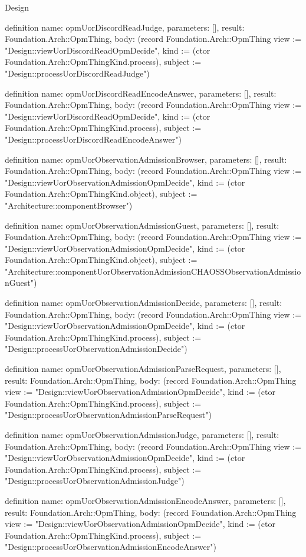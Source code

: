 \begin{lexlean}{Design}
\begin{semanticmodule}
definition{
  name: opmUorDiscordReadJudge,
  parameters: [],
  result: Foundation.Arch::OpmThing,
  body: (record Foundation.Arch::OpmThing {view := "Design::viewUorDiscordReadOpmDecide", kind := (ctor Foundation.Arch::OpmThingKind.process), subject := "Design::processUorDiscordReadJudge"})
}

definition{
  name: opmUorDiscordReadEncodeAnswer,
  parameters: [],
  result: Foundation.Arch::OpmThing,
  body: (record Foundation.Arch::OpmThing {view := "Design::viewUorDiscordReadOpmDecide", kind := (ctor Foundation.Arch::OpmThingKind.process), subject := "Design::processUorDiscordReadEncodeAnswer"})
}

definition{
  name: opmUorObservationAdmissionBrowser,
  parameters: [],
  result: Foundation.Arch::OpmThing,
  body: (record Foundation.Arch::OpmThing {view := "Design::viewUorObservationAdmissionOpmDecide", kind := (ctor Foundation.Arch::OpmThingKind.object), subject := "Architecture::componentBrowser"})
}

definition{
  name: opmUorObservationAdmissionGuest,
  parameters: [],
  result: Foundation.Arch::OpmThing,
  body: (record Foundation.Arch::OpmThing {view := "Design::viewUorObservationAdmissionOpmDecide", kind := (ctor Foundation.Arch::OpmThingKind.object), subject := "Architecture::componentUorObservationAdmissionCHAOSSObservationAdmissionGuest"})
}

definition{
  name: opmUorObservationAdmissionDecide,
  parameters: [],
  result: Foundation.Arch::OpmThing,
  body: (record Foundation.Arch::OpmThing {view := "Design::viewUorObservationAdmissionOpmDecide", kind := (ctor Foundation.Arch::OpmThingKind.process), subject := "Design::processUorObservationAdmissionDecide"})
}

definition{
  name: opmUorObservationAdmissionParseRequest,
  parameters: [],
  result: Foundation.Arch::OpmThing,
  body: (record Foundation.Arch::OpmThing {view := "Design::viewUorObservationAdmissionOpmDecide", kind := (ctor Foundation.Arch::OpmThingKind.process), subject := "Design::processUorObservationAdmissionParseRequest"})
}

definition{
  name: opmUorObservationAdmissionJudge,
  parameters: [],
  result: Foundation.Arch::OpmThing,
  body: (record Foundation.Arch::OpmThing {view := "Design::viewUorObservationAdmissionOpmDecide", kind := (ctor Foundation.Arch::OpmThingKind.process), subject := "Design::processUorObservationAdmissionJudge"})
}

definition{
  name: opmUorObservationAdmissionEncodeAnswer,
  parameters: [],
  result: Foundation.Arch::OpmThing,
  body: (record Foundation.Arch::OpmThing {view := "Design::viewUorObservationAdmissionOpmDecide", kind := (ctor Foundation.Arch::OpmThingKind.process), subject := "Design::processUorObservationAdmissionEncodeAnswer"})
}


\end{semanticmodule}
\end{lexlean}
